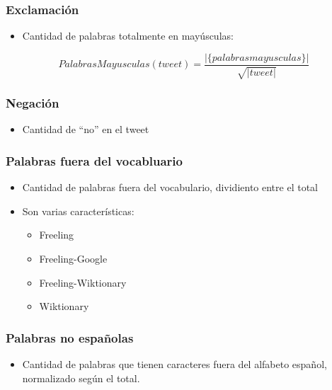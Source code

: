 \begin{frame}
    \frametitle{Exclamación}

    \begin{itemize}
        \item Cantidad de palabras totalmente en mayúsculas:
    \end{itemize}

    \begin{center}
        \[
            PalabrasMayusculas(tweet) = \frac{|\{palabras mayusculas\}|}{\sqrt{|tweet|}}
        \]
    \end{center}
\end{frame}

\begin{frame}
    \frametitle{Negación}

    \begin{itemize}
        \item Cantidad de ``no'' en el tweet
    \end{itemize}
\end{frame}

\begin{frame}
    \frametitle{Palabras fuera del vocabluario}

    \begin{itemize}
        \item Cantidad de palabras fuera del vocabulario, dividiento entre el total
        \item Son varias características:
        \begin{itemize}
            \item Freeling
            \item Freeling-Google
            \item Freeling-Wiktionary
            \item Wiktionary
        \end{itemize}
    \end{itemize}
\end{frame}

\begin{frame}
    \frametitle{Palabras no españolas}

    \begin{itemize}
        \item Cantidad de palabras que tienen caracteres fuera del alfabeto español, normalizado según el total.
    \end{itemize}
\end{frame}

